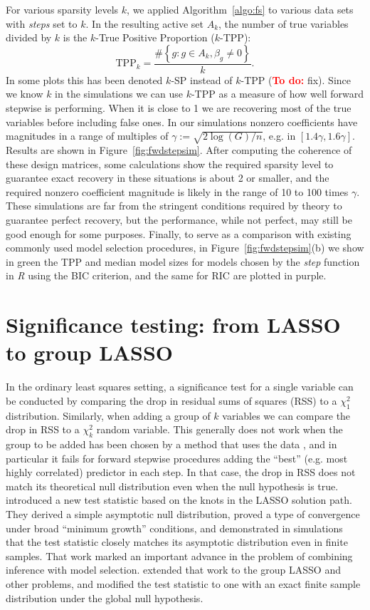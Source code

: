 \documentclass{imsart}
\newcommand{\todo}{\textcolor{red}{\textbf{To do: }}}
\begin{document}
For various sparsity levels $k$, we applied Algorithm~\ref{algo:fs} to
various data sets with \textit{steps} set to $k$.
In the resulting active set $A_k$, the number of true variables divided by $k$ is the $k$-True Positive Proportion ($k$-TPP):
\[
\text{TPP}_k = \frac{\# \left\{g: g \in A_k, \beta_g \neq 0\right\}}{k}.
\]
In some plots this has been denoted $k$-SP instead of $k$-TPP (\todo fix).
Since we know $k$ in the simulations we can use $k$-TPP as a measure of how well forward stepwise is performing. When it is close to 1 we are recovering most of the true variables before including false ones.
In our simulations nonzero coefficients have magnitudes
in a range of multiples of $\gamma := \sqrt{2\log(G)/n}$, e.g. in $[1.4
\gamma, 1.6 \gamma]$. Results are shown in
Figure~\ref{fig:fwdstepsim}. After computing the
coherence of these design matrices, some calculations show the required
sparsity level to guarantee exact recovery in these situations is
about 2 or smaller, and the required nonzero coefficient magnitude is
likely in the range of 10 to 100 times $\gamma$. These simulations are far
from the stringent conditions required by theory to guarantee perfect
recovery, but the performance, while not perfect, may still be good
enough for some purposes. Finally, to serve as a comparison with existing
commonly used model selection procedures, in Figure~\ref{fig:fwdstepsim}(b)
we show in green the TPP and median model sizes for models chosen by
the \textit{step} function in \textit{R} using the BIC criterion, and
the same for RIC are plotted in purple.



\section{Significance testing: from LASSO to group LASSO}
\label{sec:testing}

In the ordinary least squares setting, a significance test for a
single variable can be conducted by comparing the drop in residual
sums of squares (RSS) to a $\chi^2_1$ distribution. Similarly, when
adding a group of $k$ variables we can compare the drop in RSS to a
$\chi^2_k$ random variable. This generally does not work when the
group to be added has been chosen by a method that uses the data
\citep{olshen:flevel},
and in particular it fails for forward stepwise procedures adding
the ``best'' (e.g. most highly correlated) predictor in each step. In
that case, the drop in RSS does not match its
theoretical null distribution even when the null hypothesis is
true. \cite{significance:LASSO} introduced a new test statistic based
on the knots in the LASSO solution path. They derived a simple
asymptotic null distribution, proved a type of convergence under broad
``minimum growth'' conditions, and demonstrated in simulations that
the test statistic closely matches its asymptotic distribution even in
finite samples.  That work marked an important advance in the problem
of combining inference with model selection.  \cite{tests:adaptive}
extended that work to the group LASSO \citep{groupLASSO} and other
problems, and modified the test statistic to one with an exact finite
sample distribution under the global null hypothesis.
\end{document}
